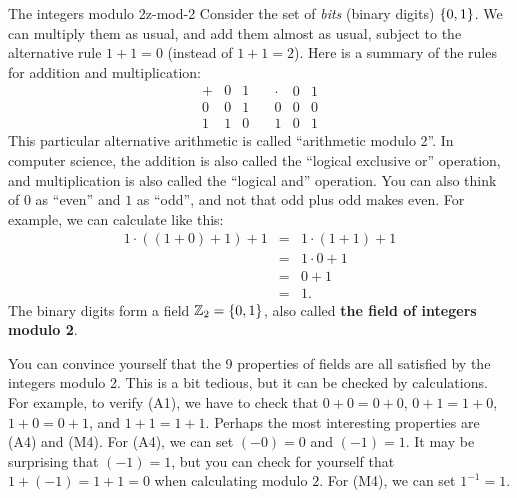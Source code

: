 \begin{example}{The integers modulo 2}{z-mod-2}
  Consider the set of {\em bits} (binary digits) $\left\{0,1\right\}$.
  We can multiply them as usual, and add them almost as usual, subject
  to the alternative rule $1+1=0$ (instead of $1+1=2$). Here is a
  summary of the rules for addition and multiplication:
  \begin{equation*}
    \begin{array}{l|ll}
      +&0&1 \\\hline
      0&0&1 \\
      1&1&0
    \end{array}
    \quad
    \begin{array}{l|ll}
      \cdot&0&1 \\\hline
      0&0&0 \\
      1&0&1
    \end{array}
  \end{equation*}
  This particular alternative arithmetic is called ``arithmetic modulo
  2''.  In computer science, the addition is also called the ``logical
  exclusive or'' operation, and
  multiplication is also called the ``logical and''
  operation. You can also think of $0$ as
  ``even'' and $1$ as ``odd'', and not that odd plus odd makes
  even. For example, we can calculate like this:
  \begin{equation*}
    \begin{array}{lll}
      1\cdot((1+0)+1) + 1 &=& 1\cdot(1+1) + 1\\
                          &=& 1\cdot 0 + 1\\
                          &=& 0 + 1\\
                          &=& 1.
    \end{array}
  \end{equation*}
  The binary digits form a field $\mathbb{Z}_2 = \left\{0,1\right\}$, also
  called \textbf{the field of integers modulo 2}.
\end{example}

You can convince yourself that the 9 properties of fields are all
satisfied by the integers modulo 2. This is a bit tedious, but it can
be checked by calculations.  For example, to verify (A1), we have to
check that $0+0=0+0$, $0+1=1+0$, $1+0=0+1$, and $1+1=1+1$. Perhaps the
most interesting properties are (A4) and (M4). For (A4), we can set
$(-0)=0$ and $(-1)=1$. It may be surprising that $(-1)=1$, but you can
check for yourself that $1+(-1)=1+1=0$ when calculating modulo
$2$. For (M4), we can set $1^{-1} = 1$.

